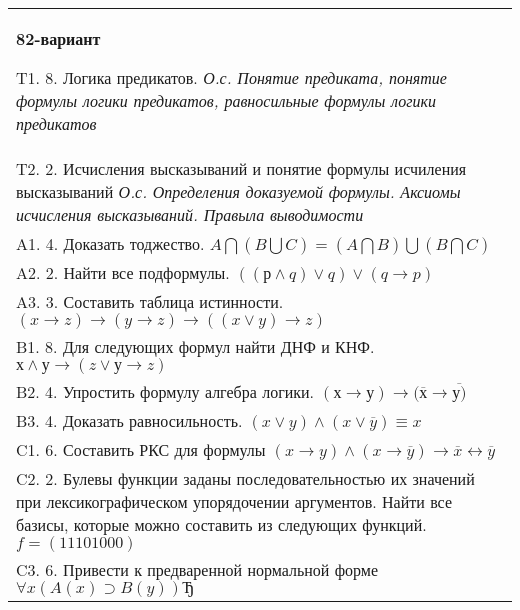 \documentclass{article}
\begin{document}
\begin{tabular}{m{17cm}}
\textbf{82-вариант}
\newline

T1. 8. Логика предикатов. \emph{О.с. Понятие предиката, понятие формулы логики предикатов, равносильные формулы логики предикатов} \\
T2. 2. Исчисления высказываний и понятие формулы исчиления высказываний \emph{О.с. Определения доказуемой формулы. Аксиомы исчисления высказываний. Правыла выводимости} \\
A1. 4. Доказать тоджество. \(A\bigcap(B\bigcup C) = (A\bigcap B)\bigcup(B\bigcap C)\) \\
A2. 2. Найти все подформулы. \(\left( (р \land q) \vee q \right) \vee (q \rightarrow p)\) \\
A3. 3. Составить таблица истинности. \((x \rightarrow z) \rightarrow (y \rightarrow z) \rightarrow ((x \vee y) \rightarrow z)\) \\
B1. 8. Для следующих формул найти ДНФ и КНФ. \(х \land у \rightarrow (z \vee у \rightarrow z)\) \\
B2. 4. Упростить формулу алгебра логики. \((х \rightarrow у) \rightarrow (\overline{х} \rightarrow \overline{у)}\) \\
B3. 4. Доказать равносильность. \((x \vee y) \land (x \vee \overline{y}) \equiv x\) \\
C1. 6. Составить РКС для формулы \((x \rightarrow y) \land (x \rightarrow \overline{y}) \rightarrow \overline{x} \leftrightarrow \overline{y}\) \\
C2. 2. Булевы функции заданы последовательностью их значений при лексикографическом упорядочении аргументов. Найти все базисы, которые можно составить из следующих функций. \(f = (11101000)\) \\
C3. 6. Привести к предваренной нормальной форме \(\forall x(A(x) \supset B(y))Ђ\) \\

\end{tabular}
\vspace{1cm}
\end{document}
